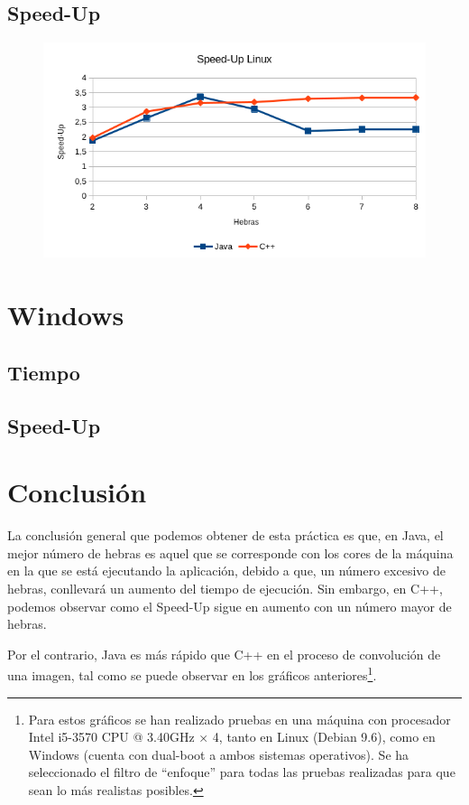 \documentclass[12pt,letterpaper]{article}
\begin{document}
\subsection{Speed-Up}
\begin{figure}[h]
	\centering
	\includegraphics[scale=0.8]{SpeedUpLinux.png}
\end{figure}
\newpage

\section{Windows}
\subsection{Tiempo}
\subsection{Speed-Up}

\section{Conclusión}
La conclusión general que podemos obtener de esta práctica es que, en Java, el mejor número de hebras es aquel que se corresponde con los cores de la máquina en la que se está ejecutando la aplicación, debido a que, un número excesivo de hebras, conllevará un aumento del tiempo de ejecución. Sin embargo, en C++, podemos observar como el Speed-Up sigue en aumento con un número mayor de hebras.

Por el contrario, Java es más rápido que C++ en el proceso de convolución de una imagen, tal como se puede observar en los gráficos anteriores\footnote{Para estos gráficos se han realizado pruebas en una máquina con procesador Intel i5-3570 CPU @ 3.40GHz × 4, tanto en Linux (Debian 9.6), como en Windows (cuenta con dual-boot a ambos sistemas operativos). Se ha seleccionado el filtro de ``enfoque'' para todas las pruebas realizadas para que sean lo más realistas posibles.}.
\end{document}
